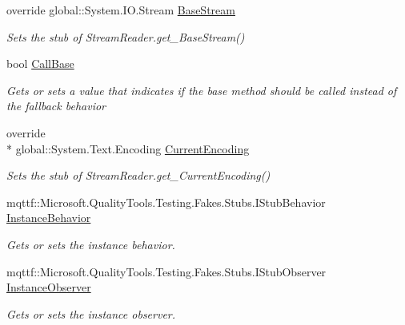 \begin{DoxyCompactItemize}
\item 
override global\-::\-System.\-I\-O.\-Stream \hyperlink{class_system_1_1_i_o_1_1_fakes_1_1_stub_stream_reader_a2b535801a76af91d7b97d5ec332b5dfa}{Base\-Stream}
\begin{DoxyCompactList}\small\item\em Sets the stub of Stream\-Reader.\-get\-\_\-\-Base\-Stream()\end{DoxyCompactList}\item 
bool \hyperlink{class_system_1_1_i_o_1_1_fakes_1_1_stub_stream_reader_a77247f8ffea56da95ab41121b75c8250}{Call\-Base}
\begin{DoxyCompactList}\small\item\em Gets or sets a value that indicates if the base method should be called instead of the fallback behavior\end{DoxyCompactList}\item 
override \\*
global\-::\-System.\-Text.\-Encoding \hyperlink{class_system_1_1_i_o_1_1_fakes_1_1_stub_stream_reader_af836c82c867728770939ff5683279809}{Current\-Encoding}
\begin{DoxyCompactList}\small\item\em Sets the stub of Stream\-Reader.\-get\-\_\-\-Current\-Encoding()\end{DoxyCompactList}\item 
mqttf\-::\-Microsoft.\-Quality\-Tools.\-Testing.\-Fakes.\-Stubs.\-I\-Stub\-Behavior \hyperlink{class_system_1_1_i_o_1_1_fakes_1_1_stub_stream_reader_ab598a61bffe62ff1ce91f3219288a2a7}{Instance\-Behavior}
\begin{DoxyCompactList}\small\item\em Gets or sets the instance behavior.\end{DoxyCompactList}\item 
mqttf\-::\-Microsoft.\-Quality\-Tools.\-Testing.\-Fakes.\-Stubs.\-I\-Stub\-Observer \hyperlink{class_system_1_1_i_o_1_1_fakes_1_1_stub_stream_reader_a3704f73acbff505cc17223c801087dfb}{Instance\-Observer}
\begin{DoxyCompactList}\small\item\em Gets or sets the instance observer.\end{DoxyCompactList}\end{DoxyCompactItemize}


